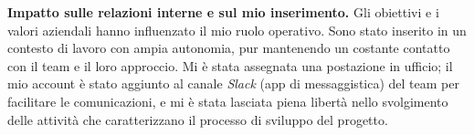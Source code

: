 \medskip
\noindent\textbf{Impatto sulle relazioni interne e sul mio inserimento.} Gli obiettivi e i valori aziendali hanno influenzato il mio ruolo operativo. 
Sono stato inserito in un contesto di lavoro con ampia autonomia, pur mantenendo un costante contatto con il team e il loro approccio. 
Mi è stata assegnata una postazione in ufficio; il mio account è stato aggiunto al canale \emph{Slack} (app di messaggistica) del team per facilitare le comunicazioni, 
e mi è stata lasciata piena libertà nello svolgimento delle attività che caratterizzano il processo di sviluppo del progetto.
